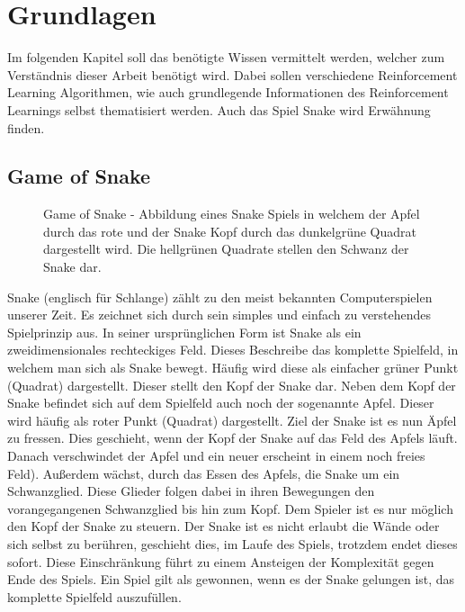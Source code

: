 
\chapter{Grundlagen}\label{sec:Grundlagen}
Im folgenden Kapitel soll das benötigte Wissen vermittelt werden, welcher zum Verständnis dieser Arbeit benötigt wird. Dabei sollen verschiedene Reinforcement Learning Algorithmen, wie auch grundlegende Informationen des Reinforcement Learnings selbst thematisiert werden. Auch das Spiel Snake wird Erwähnung finden. 
\section{Game of Snake}
\begin{figure}[H]
	\centering
	\def\svgscale{0.90}
	
	\caption[Game of Snake]{Game of Snake - Abbildung eines Snake Spiels in welchem der Apfel durch das rote und der Snake Kopf durch das dunkelgrüne Quadrat dargestellt wird. Die hellgrünen Quadrate stellen den Schwanz der Snake dar.}
	\label{fig:Game_of_Snake}
\end{figure}
Snake (englisch für Schlange) zählt zu den meist bekannten Computerspielen unserer Zeit. Es zeichnet sich durch sein simples und einfach zu verstehendes Spielprinzip aus.
In seiner ursprünglichen Form ist Snake als ein zweidimensionales rechteckiges Feld. Dieses Beschreibe das komplette Spielfeld, in welchem man sich als Snake bewegt. Häufig wird diese als einfacher grüner Punkt (Quadrat) dargestellt. Dieser stellt den Kopf der Snake dar. Neben dem Kopf der Snake befindet sich auf dem Spielfeld auch noch der sogenannte Apfel. Dieser wird häufig als roter Punkt (Quadrat) dargestellt.
Ziel der Snake ist es nun Äpfel zu fressen. Dies geschieht, wenn der Kopf der Snake auf das Feld des Apfels läuft. Danach verschwindet der Apfel und ein neuer erscheint in einem noch freies Feld). Außerdem wächst, durch das Essen des Apfels, die Snake um ein Schwanzglied. Diese Glieder folgen dabei in ihren Bewegungen den vorangegangenen Schwanzglied bis hin zum Kopf. Dem Spieler ist es nur möglich den Kopf der Snake zu steuern.
Der Snake ist es nicht erlaubt die Wände oder sich selbst zu berühren, geschieht dies, im Laufe des Spiels, trotzdem endet dieses sofort. Diese Einschränkung führt zu einem Ansteigen der Komplexität gegen Ende des Spiels. Ein Spiel gilt als gewonnen, wenn es der Snake gelungen ist, das komplette Spielfeld auszufüllen.

